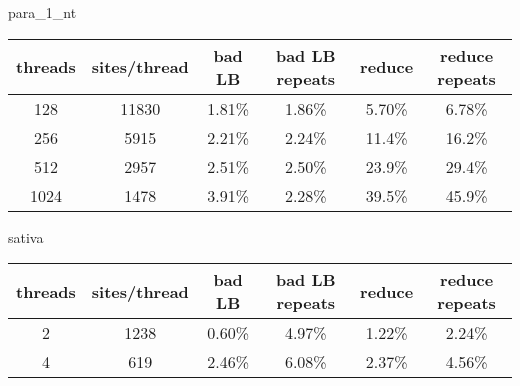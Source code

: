 \documentclass[a4paper]{article}
\begin{document}
para\_1\_nt

\begin{tabular}{|c|c|c|c|c|c|}
\hline threads & sites/thread & bad LB & bad LB repeats & reduce & reduce repeats \\
\hline 128 & 11830 & 1.81\% & 1.86\% & 5.70\% & 6.78\% \\
\hline 256 & 5915 & 2.21\% & 2.24\% & 11.4\% & 16.2\% \\
\hline 512 & 2957 & 2.51\% & 2.50\% & 23.9\% & 29.4\% \\
\hline 1024 & 1478 & 3.91\% & 2.28\% & 39.5\% & 45.9\% \\
\hline
\end{tabular}
\newline

sativa

\begin{tabular}{|c|c|c|c|c|c|}
\hline threads & sites/thread & bad LB & bad LB repeats & reduce & reduce repeats \\
\hline 2 & 1238 & 0.60\% & 4.97\% & 1.22\% & 2.24\% \\
\hline 4 & 619 & 2.46\% & 6.08\% & 2.37\% & 4.56\% \\
\hline
\end{tabular}
\newline
\end{document}
